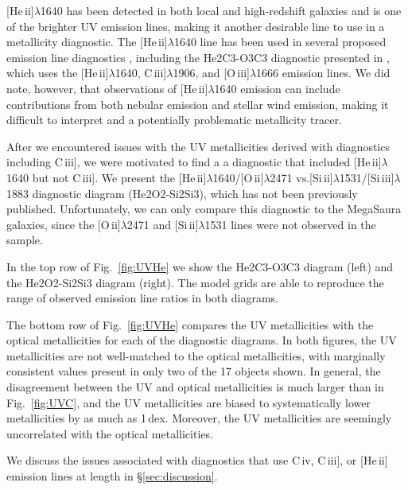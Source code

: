 \documentclass[preprint2]{aastex62}
\newcommand{\oiii}{[O\,{\sc iii}]\xspace}
\newcommand{\oii}{[O\,{\sc ii}]\xspace}
\newcommand{\heii}{[He\,{\sc ii}]\xspace}
\newcommand{\civ}{C\,{\sc iv}\xspace}
\newcommand{\SiuII}{[Si\,{\sc ii}]\xspace}
\newcommand{\SiuIII}{[Si\,{\sc iii}]\xspace}
\newcommand{\ciii}{C\,{\sc iii}]\xspace}
\newcommand\vs{\ensuremath{\mathrm{vs.}}\xspace}
\newcommand{\mage}{{\sc Meg}a{\sc S}a{\sc ura}\xspace}
\begin{document}
\heii$\lambda$1640 has been detected in both local and high-redshift galaxies and is one of the brighter UV emission lines, making it another desirable line to use in a metallicity diagnostic. The \heii$\lambda$1640 line has been used in several proposed emission line diagnostics \citep[e.g.,][]{Jaskot+2016, Feltre+2016}, including the He2C3-O3C3 diagnostic presented in \citet{Byler+2018}, which uses the \heii$\lambda$1640, \ciii$\lambda$1906, and \oiii$\lambda$1666 emission lines. We did note, however, that observations of \heii$\lambda$1640 emission can include contributions from both nebular emission and stellar wind emission, making it difficult to interpret and a potentially problematic metallicity tracer.

After we encountered issues with the UV metallicities derived with diagnostics including \ciii, we were motivated to find a a diagnostic that included \heii$\lambda$1640 but not \ciii. We present the \heii$\lambda$1640/\oii$\lambda$2471 \vs \SiuII$\lambda$1531/\SiuIII$\lambda$1883 diagnostic diagram (He2O2-Si2Si3), which has not been previously published. Unfortunately, we can only compare this diagnostic to the \mage galaxies, since the \oii$\lambda$2471 and \SiuII$\lambda$1531 lines were not observed in the \citet{Berg+2016} sample.

In the top row of Fig.~\ref{fig:UVHe} we show the He2C3-O3C3 diagram (left) and the He2O2-Si2Si3 diagram (right).  The model grids are able to reproduce the range of observed emission line ratios in both diagrams.

The bottom row of Fig.~\ref{fig:UVHe} compares the UV metallicities with the optical metallicities for each of the diagnostic diagrams. In both figures, the UV metallicities are not well-matched to the optical metallicities, with marginally consistent values present in only two of the 17 objects shown. In general, the disagreement between the UV and optical metallicities is much larger than in Fig.~\ref{fig:UVC}, and the UV metallicities are biased to systematically lower metallicities by as much as 1\,dex. Moreover, the UV metallicities are seemingly uncorrelated with the optical metallicities.

We discuss the issues associated with diagnostics that use \civ, \ciii, or \heii emission lines at length in \S\ref{sec:discussion}.
\end{document}
